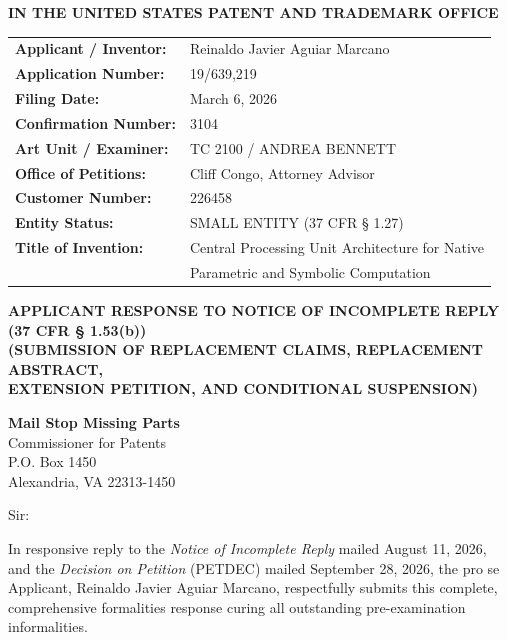 \documentclass[11pt,letterpaper]{article}
\begin{document}
\thispagestyle{empty}

\begin{center}
    \textbf{\large IN THE UNITED STATES PATENT AND TRADEMARK OFFICE}
\end{center}

\vspace{0.3cm}
\noindent\begin{tabular}{p{2.3in}p{4.0in}}
\textbf{Applicant / Inventor:} & Reinaldo Javier Aguiar Marcano \\
\textbf{Application Number:} & 19/639,219 \\
\textbf{Filing Date:} & March 6, 2026 \\
\textbf{Confirmation Number:} & 3104 \\
\textbf{Art Unit / Examiner:} & TC 2100 / ANDREA BENNETT \\
\textbf{Office of Petitions:} & Cliff Congo, Attorney Advisor \\
\textbf{Customer Number:} & 226458 \\
\textbf{Entity Status:} & SMALL ENTITY (37 CFR \S{} 1.27) \\
\textbf{Title of Invention:} & Central Processing Unit Architecture for Native \\
& Parametric and Symbolic Computation \\
\end{tabular}

\vspace{0.4cm}
\begin{center}
    \textbf{\large APPLICANT RESPONSE TO NOTICE OF INCOMPLETE REPLY \\
    (37 CFR \S{} 1.53(b))} \\
    \textbf{\normalsize (SUBMISSION OF REPLACEMENT CLAIMS, REPLACEMENT ABSTRACT, \\
    EXTENSION PETITION, AND CONDITIONAL SUSPENSION)}
\end{center}

\noindent\textbf{Mail Stop Missing Parts} \\
Commissioner for Patents \\
P.O. Box 1450 \\
Alexandria, VA 22313-1450

\vspace{0.2cm}
Sir:

In responsive reply to the \textit{Notice of Incomplete Reply} mailed August 11, 2026, and the \textit{Decision on Petition} (PETDEC) mailed September 28, 2026, the pro se Applicant, Reinaldo Javier Aguiar Marcano, respectfully submits this complete, comprehensive formalities response curing all outstanding pre-examination informalities.
\end{document}
